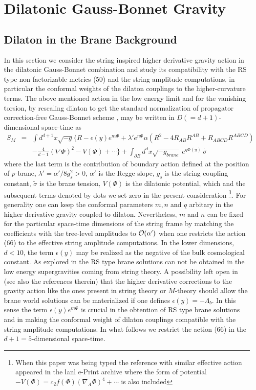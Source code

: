 \documentclass[a4paper,12pt]{article}
\newcommand {\nn} {\nonumber}
\begin{document}
\section{Dilatonic Gauss-Bonnet Gravity}
\subsection{Dilaton in the Brane Background}
In this section we consider the string inspired higher 
derivative gravity action in the dilatonic Gauss-Bonnet combination and 
study its compatibility with the RS type non-factorizable metrics (50) and 
the string amplitude computations, in particular the conformal weights of 
the dilaton couplings to the higher-curvature terms. 
The above mentioned action in the low energy limit and for the vanishing 
torsion, by rescaling dilaton to get the standard normalization of 
propagator correction-free Gauss-Bonnet scheme \cite{AAT}, may be written in 
$D(=d+1)$-dimensional space-time as
\begin{eqnarray}
S_M&=&\int d^{d+1}x \sqrt{-g}\big\{R-\epsilon(y)e^{m\Phi}+\lambda'e^{n\Phi}
\alpha(R^2-4R_{AB}R^{AB}+R_{ABCD}R^{ABCD})\nn\\
&&-\frac{4}{d-1}(\nabla\Phi)^2-V(\Phi)+\cdots\big\}
+\int_{\partial B} d^dx\sqrt{-g_{brane}}~ e^{q\Phi(y)}~ \tilde{\sigma}
\end{eqnarray}
where the last term is the contribution of boundary action defined
at the position of $p$-brane, $\lambda'=\alpha'/{8g_s^2}>0$, $\alpha'$ is 
the Regge slope, $g_s$ is the string coupling constant, $\tilde{\sigma}$ 
is the brane tension, $V(\Phi)$ is the dilatonic potential, which and the 
subsequent terms denoted by dots we set zero in the present 
consideration \footnote{ When this paper was being typed 
the reference \cite{NIC} with similar effective action appeared in the lanl 
e-Print archive where the form of potential 
$-V(\Phi)=c_2 f(\Phi)(\nabla_A\Phi)^4+\cdots$ is also included}. For 
generality one can keep the conformal parameters $m, n$ and $q$ arbitary in 
the higher derivative gravity coupled to dilaton. Nevertheless, 
$m$ and $n$ can be fixed for the particular space-time 
dimensions of the string frame by matching the coefficients with the 
tree-level amplitudes to ${\cal O}(\alpha')$ when one restricts the action 
(66) to the effective string amplitude computations. In the 
lower dimensions, $d<10$, the term $\epsilon(y)$ may be realized as the 
negative of the bulk cosmological constant. As explored in \cite{JMC} the 
RS type brane solutions can not be obtained in the low energy supergravities 
coming from string theory. A possibility left open in \cite{JMC} 
(see also the references therein) that the higher derivative corrections 
to the gravity action like the ones present in string theory or $M$-theory 
should allow the brane world solutions can be materialized if one defines 
$\epsilon(y)=-\Lambda_b$. In this sense the term $\epsilon(y)e^{m\Phi}$ is 
crucial in the obtention of RS type brane solutions and in making 
the conformal weight of dilaton couplings compatible with the string 
amplitude computations. In what follows we 
restrict the action (66) in the $d+1=5$-dimensional space-time.       
 
\end{document}
